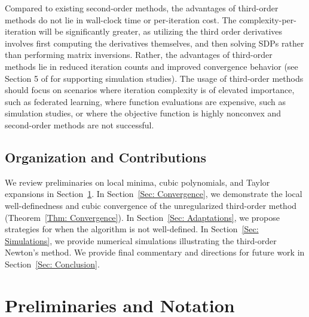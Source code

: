 \documentclass[11pt]{article}
\theoremstyle{plain}
\theoremstyle{definition}
\theoremstyle{remark}
\begin{document}
Compared to existing second-order methods, the advantages of third-order methods do not lie in wall-clock time or per-iteration cost. The complexity-per-iteration will be significantly greater, as utilizing the third order derivatives involves first computing the derivatives themselves, and then solving SDPs rather than performing matrix inversions. Rather, the advantages of third-order methods lie in reduced iteration counts and improved convergence behavior (see Section 5 of \cite{cai2026globally} for supporting simulation studies). The usage of third-order methods should focus on scenarios where iteration complexity is of elevated importance, such as federated learning, where function evaluations are expensive, such as simulation studies, or where the objective function is highly nonconvex and second-order methods are not successful.

\subsection*{Organization and Contributions}\label{SSec: Organization}

We review preliminaries on local minima, cubic polynomials, and Taylor expansions in Section~\ref{Sec: Preliminaries}. In Section~\ref{Sec: Convergence}, we demonstrate the local well-definedness and cubic convergence of the unregularized third-order method (Theorem~\ref{Thm: Convergence}). In Section~\ref{Sec: Adaptations}, we propose strategies for when the algorithm is not well-defined. In Section~\ref{Sec: Simulations}, we provide numerical simulations illustrating the third-order Newton's method. We provide final commentary and directions for future work in Section~\ref{Sec: Conclusion}.

\section{Preliminaries and Notation}\label{Sec: Preliminaries}
\end{document}
